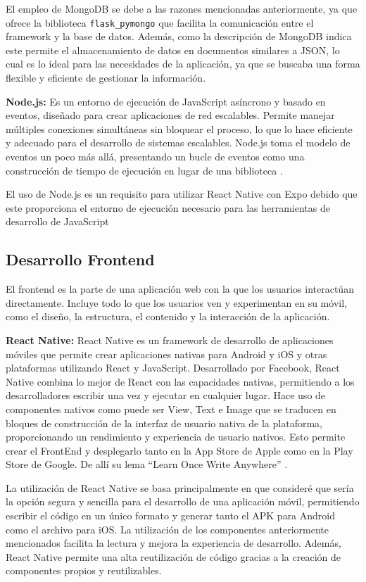 El empleo de MongoDB se debe a las razones mencionadas anteriormente, ya que ofrece la biblioteca \texttt{flask\_pymongo} que facilita la comunicación entre el framework y la base de datos. Además, como la descripción de MongoDB indica este permite el almacenamiento de datos en documentos similares a JSON, lo cual es lo ideal para las necesidades de la aplicación, ya que se buscaba una forma flexible y eficiente de gestionar la información. 

\textbf{Node.js:} Es un entorno de ejecución de JavaScript asíncrono y basado en eventos, diseñado para crear aplicaciones de red escalables. Permite manejar múltiples conexiones simultáneas sin bloquear el proceso, lo que lo hace eficiente y adecuado para el desarrollo de sistemas escalables. Node.js toma el modelo de eventos un poco más allá, presentando un bucle de eventos como una construcción de tiempo de ejecución en lugar de una biblioteca \cite{nodejs}.

El uso de Node.js es un requisito para utilizar React Native con Expo debido que este proporciona el entorno de ejecución necesario para las herramientas de desarrollo de JavaScript

\subsection{Desarrollo Frontend}

El frontend es la parte de una aplicación web con la que los usuarios interactúan directamente. Incluye todo lo que los usuarios ven y experimentan en su móvil, como el diseño, la estructura, el contenido y la interacción de la aplicación.

\textbf{React Native:} React Native es un framework de desarrollo de aplicaciones móviles que permite crear aplicaciones nativas para Android y iOS y otras plataformas utilizando React y JavaScript. Desarrollado por Facebook, React Native combina lo mejor de React con las capacidades nativas, permitiendo a los desarrolladores escribir una vez y ejecutar en cualquier lugar. Hace uso de componentes nativos como puede ser View, Text e Image que se traducen en bloques de construcción de la interfaz de usuario nativa de la plataforma, proporcionando un rendimiento y experiencia de usuario nativos. Esto permite crear el FrontEnd y desplegarlo tanto en la App Store de Apple como en la Play Store de Google. De allí su lema “Learn Once Write Anywhere” \cite{react_native}.

La utilización de React Native se basa principalmente en que consideré que sería la opción segura y sencilla para el desarrollo de una aplicación móvil, permitiendo escribir el código en un único formato y generar tanto el APK para Android como el archivo para iOS. La utilización de los componentes anteriormente mencionados facilita la lectura y mejora la experiencia de desarrollo. Además, React Native permite una alta reutilización de código gracias a la creación de componentes propios y reutilizables. 

